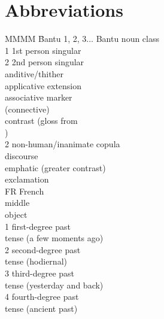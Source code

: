 \documentclass[output=paper,colorlinks,citecolor=brown
]{langscibook}
\begin{document}
\section*{Abbreviations}
\begin{multicols}{2}
\begin{tabbing}
MMMM \= Bantu\kill
1, 2, 3... \> Bantu noun class  \\
1\SG{} \> 1st person singular \\
2\SG{} \> 2nd person singular \\
\AND{} \> anditive/thither \\
\APPL{} \> applicative extension \\
\ASS{} \> associative marker \\ \> (connective) \\
\CONTR{} \> contrast (gloss from \\ \> \citealt{Mous2003}) \\
\COP{}2 \> non-human/inanimate copula \\
\DISC{} \> discourse \\
\EMPH{} \> emphatic (greater contrast) \\
\EXCL{} \> exclamation \\
FR \> French \\
\MID{} \> middle \\
\OBJ{} \> object \\
\PST{}1 \> first-degree past  \\ \> tense  (a few moments ago) \\
\PST{}2 \> second-degree past \\ \> tense (hodiernal) \\
\PST{}3 \> third-degree past  \\ \> tense (yesterday and back) \\
\PST{}4 \> fourth-degree past \\ \> tense (ancient past) \\

\end{tabbing}
\end{multicols}
\end{document}
